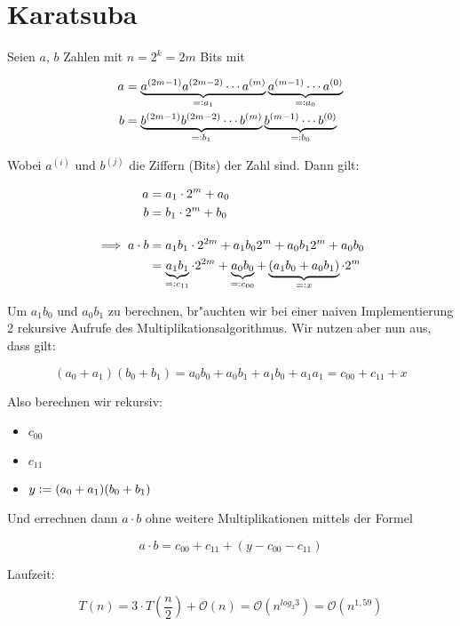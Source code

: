 \documentclass{scrartcl}
\newcommand{\defeq}{\vcentcolon=}
\newcommand{\eqdef}{=\vcentcolon}
\newcommand{\bigO}{\ensuremath{\mathcal{O}}}
\begin{document}
\section{Karatsuba}
Seien $a$, $b$ Zahlen mit $n = 2^k = 2m$ Bits mit

\begin{align*}
a &= \underbrace{a^{(2m-1)}a^{(2m-2)}\cdots a^{(m)}}_{\eqdef a_1}\underbrace{a^{(m-1)} \cdots a^{(0)}}_{\eqdef a_0} \\
b &= \underbrace{b^{(2m-1)}b^{(2m-2)}\cdots b^{(m)}}_{\eqdef b_1}\underbrace{b^{(m-1)} \cdots b^{(0)}}_{\eqdef b_0}
\end{align*}

Wobei $a^{(i)}$ und $b^{(j)}$ die Ziffern (Bits) der Zahl sind. Dann gilt:

\begin{align*}
a &= a_1\cdot 2^m + a_0 \\
b &= b_1\cdot 2^m + b_0 \\[1em]
\implies a \cdot b &= a_1 b_1\cdot 2^{2m} + a_1 b_0 2^m + a_0 b_1 2^m + a_0 b_0 \\
&= \underbrace{a_1 b_1}_{\eqdef c_{11}}\cdot 2^{2m} + \underbrace{a_0 b_0}_{\eqdef c_{00}}
                            + \underbrace{(a_1 b_0 + a_0 b_1)}_{\eqdef x}\cdot 2^m
\end{align*}

Um $a_1 b_0$ und $a_0 b_1$ zu berechnen, br"auchten wir bei einer naiven Implementierung 2 rekursive Aufrufe des
Multiplikationsalgorithmus. Wir nutzen aber nun aus, dass gilt:

\[(a_0 + a_1)(b_0 + b_1) = a_0 b_0 + a_0 b_1 + a_1 b_0 + a_1 a_1 = c_{00} + c_{11} + x \]

Also berechnen wir rekursiv:

\begin{itemize}
\item $c_{00}$
\item $c_{11}$
\item $y \defeq (a_0 + a_1)(b_0 + b_1)$
\end{itemize}

Und errechnen dann $a \cdot b$ ohne weitere Multiplikationen mittels der Formel

\[ a \cdot b = c_{00} + c_{11} + \left(y - c_{00} - c_{11}\right) \]

Laufzeit:

\[ T(n) = 3\cdot T\left(\frac{n}{2}\right) + \bigO(n) = \bigO(n^{log_2 3}) = \bigO(n^{1,59})\]
\end{document}
